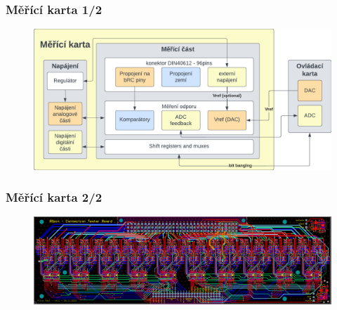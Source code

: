 \documentclass[%
  12pt,       				%
	t,                  %
	aspectratio=1610,   %
	unicode,						%
]{beamer}				    	%
\begin{document}
\begin{frame} 
	\frametitle{Měřící karta 1/2}
	\vspace*{0.5cm}
	\begin{figure}[ht!]
		\centering
		\includegraphics[width = \textwidth]{obrazky/karta_system_diagram.png}
	\end{figure}
\end{frame}

\begin{frame} 
	\frametitle{Měřící karta  2/2}
	\vspace*{1cm}
	\begin{figure}[ht!]
		\centering
		\includegraphics[width = \textwidth]{obrazky/all_layers_no_poly.png}
	\end{figure}
\end{frame}
\end{document}
